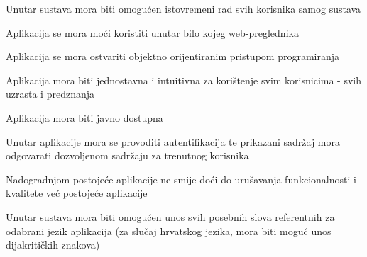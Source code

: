 			  \begin{packed_item}
			 	\item Unutar sustava mora biti omogućen istovremeni rad svih korisnika samog sustava
			 	\item Aplikacija se mora moći koristiti unutar bilo kojeg web-preglednika
			 	\item Aplikacija se mora ostvariti objektno orijentiranim pristupom programiranja
			 	\item Aplikacija mora biti jednostavna i intuitivna za korištenje svim korisnicima - svih uzrasta i predznanja
			 	\item Aplikacija mora biti javno dostupna
			 	\item Unutar aplikacije mora se provoditi autentifikacija te prikazani sadržaj mora odgovarati dozvoljenom sadržaju za trenutnog korisnika
			 	\item Nadogradnjom postojeće aplikacije ne smije doći do urušavanja funkcionalnosti i kvalitete već postojeće aplikacije
			 	\item Unutar sustava mora biti omogućen unos svih posebnih slova referentnih za odabrani jezik aplikacija (za slučaj hrvatskog jezika, mora biti moguć unos dijakritičkih znakova)
			 \end{packed_item}



